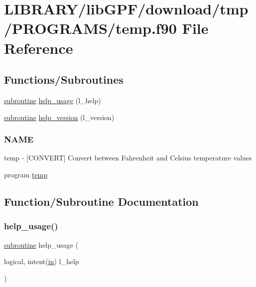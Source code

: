 \hypertarget{temp_8f90}{}\section{L\+I\+B\+R\+A\+R\+Y/lib\+G\+P\+F/download/tmp/\+P\+R\+O\+G\+R\+A\+M\+S/temp.f90 File Reference}
\label{temp_8f90}
\subsection*{Functions/\+Subroutines}
\begin{DoxyCompactItemize}
\item 
\hyperlink{M__stopwatch_83_8txt_acfbcff50169d691ff02d4a123ed70482}{subroutine} \hyperlink{temp_8f90_a3e09a3b52ee8fb04eeb93fe5761626a8}{help\+\_\+usage} (l\+\_\+help)
\item 
\hyperlink{M__stopwatch_83_8txt_acfbcff50169d691ff02d4a123ed70482}{subroutine} \hyperlink{temp_8f90_a39c21619b08a3c22f19e2306efd7f766}{help\+\_\+version} (l\+\_\+version)
\begin{DoxyCompactList}\small\item\em \subsubsection*{N\+A\+ME}

temp -\/ \mbox{[}C\+O\+N\+V\+E\+RT\mbox{]} Convert between Fahrenheit and Celsius temperature values \end{DoxyCompactList}\item 
program \hyperlink{temp_8f90_ae3dd9015488975da65db0e05e1d019c3}{temp}
\end{DoxyCompactItemize}


\subsection{Function/\+Subroutine Documentation}
\mbox{\label{temp_8f90_a3e09a3b52ee8fb04eeb93fe5761626a8}} 
\subsubsection{\texorpdfstring{help\+\_\+usage()}{help\_usage()}}
{\footnotesize\ttfamily \hyperlink{M__stopwatch_83_8txt_acfbcff50169d691ff02d4a123ed70482}{subroutine} help\+\_\+usage (\begin{DoxyParamCaption}\item[{logical, intent(\hyperlink{M__journal_83_8txt_afce72651d1eed785a2132bee863b2f38}{in})}]{l\+\_\+help }\end{DoxyParamCaption})}



